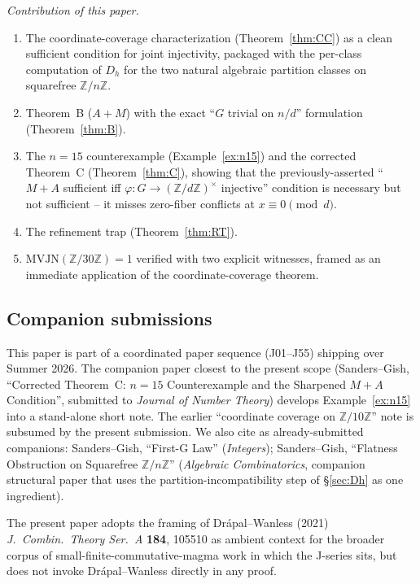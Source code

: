 \documentclass[11pt,reqno]{amsart}
\theoremstyle{plain}
\theoremstyle{definition}
\newcommand{\Z}{\mathbb{Z}}
\newcommand{\Zn}{\Z/n\Z}
\begin{document}
\emph{Contribution of this paper.}
\begin{enumerate}[label=(\roman*)]
\item The coordinate-coverage characterization
(Theorem~\ref{thm:CC}) as a clean sufficient condition for joint
injectivity, packaged with the per-class computation of $D_h$ for the
two natural algebraic partition classes on squarefree $\Zn$.
\item Theorem~B ($A{+}M$) with the exact ``$G$ trivial on $n/d$''
formulation (Theorem~\ref{thm:B}).
\item The $n = 15$ counterexample (Example~\ref{ex:n15}) and the
corrected Theorem~C (Theorem~\ref{thm:C}), showing that the
previously-asserted ``$M{+}A$ sufficient iff
$\varphi: G \to (\Z/d\Z)^{\times}$ injective'' condition is
necessary but not sufficient -- it misses zero-fiber conflicts at
$x \equiv 0 \pmod d$.
\item The refinement trap (Theorem~\ref{thm:RT}).
\item $\mathrm{MVJN}(\Z/30\Z) = 1$ verified with two explicit
witnesses, framed as an immediate application of the
coordinate-coverage theorem.
\end{enumerate}

\subsection{Companion submissions} \label{ssec:companions}

This paper is part of a coordinated paper sequence (J01--J55) shipping
over Summer 2026. The companion paper closest to the present scope
(Sanders--Gish, ``Corrected Theorem~C: $n = 15$ Counterexample and
the Sharpened $M{+}A$ Condition'', submitted to \emph{Journal of
Number Theory}) develops Example~\ref{ex:n15} into a stand-alone
short note. The earlier ``coordinate coverage on
$\Z/10\Z$'' note is subsumed by the present submission. We also
cite as already-submitted companions: Sanders--Gish, ``First-G Law''
(\emph{Integers}); Sanders--Gish, ``Flatness Obstruction on Squarefree
$\Z/n\Z$'' (\emph{Algebraic Combinatorics}, companion structural paper
that uses the partition-incompatibility step of \S\ref{sec:Dh} as one
ingredient).

The present paper adopts the framing of Dr\'apal--Wanless (2021)
\emph{J.\ Combin.\ Theory Ser.\ A} \textbf{184}, 105510 as ambient
context for the broader corpus of small-finite-commutative-magma
work in which the J-series sits, but does not invoke
Dr\'apal--Wanless directly in any proof.
\end{document}
